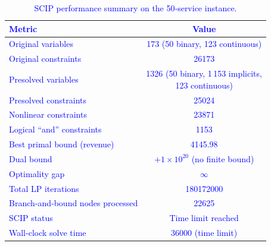 \documentclass[Afour,sagev,times]{sagej}
\newcommand{\primero}[1]{\textcolor{blue}{#1}}
\begin{document}
\begin{table}[htbp]
\centering
\scriptsize
\caption{SCIP performance summary on the 50‐service instance.}
\primero{
\begin{tabular}{|p{}|c|}
\hline
\textbf{Metric}                              & \textbf{Value}                                         \\ \hline
Original variables                           & 173 (50 binary, 123 continuous)                               \\ 
Original constraints                         & 26173                                                       \\ \hline
Presolved variables                          & \makecell{1326 (50 binary, 1\,153 implicits,\\123 continuous)} \\ 
Presolved constraints                        & 25024                                                        \\ 
\quad Nonlinear constraints                   & 23871                                                        \\ 
\quad Logical “and” constraints               & 1153                                                         \\ \hline
Best primal bound (revenue)                  & 4145.98                                                      \\ 
Dual bound                                    & \(+1\times10^{20}\) (no finite bound)                          \\ 
Optimality gap                               & \(\infty\)                                                     \\ \hline
Total LP iterations                          & 180172000                                                       \\ 
Branch‐and‐bound nodes processed              & 22625                                                         \\ 
SCIP status                                  & Time limit reached                                              \\ 
Wall‐clock solve time                        & 36000 (time limit)                                          \\ \hline
\end{tabular}
}
\label{tab:scip_50_summary}
\end{table}
\end{document}
